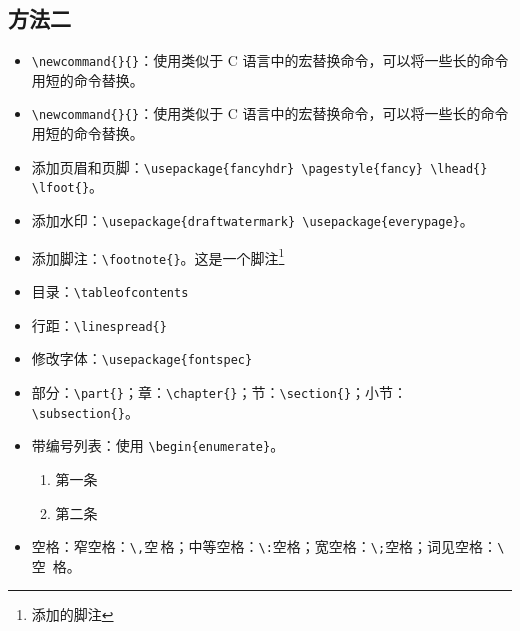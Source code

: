 \documentclass[a4paper, 12pt]{article} %
\numberwithin{equation}{section} %
\numberwithin{figure}{section} %
\begin{document}
        \subsection{方法二} \label{subsec:method2}
            \begin{itemize}
                \item \verb|\newcommand{}{}|：使用类似于 C 语言中的宏替换命令，可以将一些长的命令用短的命令替换。
                \item \verb|\newcommand{}{}|：使用类似于 C 语言中的宏替换命令，可以将一些长的命令用短的命令替换。
                \item 添加页眉和页脚：\verb|\usepackage{fancyhdr} \pagestyle{fancy} \lhead{} \lfoot{}|。
                \item 添加水印：\verb|\usepackage{draftwatermark} \usepackage{everypage}|。
                \item 添加脚注：\verb|\footnote{}|。这是一个脚注\footnote{添加的脚注}
                \item 目录：\verb|\tableofcontents|
                \item 行距：\verb|\linespread{}|
                \item 修改字体：\verb|\usepackage{fontspec}|
                \item 部分：\verb|\part{}|；章：\verb|\chapter{}|；节：\verb|\section{}|；小节：\verb|\subsection{}|。
                \item 带编号列表：使用 \verb|\begin{enumerate}|。
                    \begin{enumerate}
                        \item 第一条
                        \item 第二条
                    \end{enumerate}
                \item 空格：窄空格：\verb|\,|空\,格；中等空格：\verb|\:|空\:格；宽空格：\verb|\;|空\;格；词见空格：\verb|\ |空\ 格。

\end{itemize}
\end{document}
